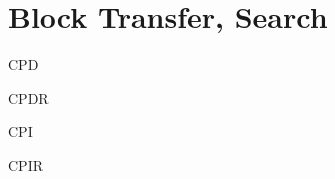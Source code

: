 \section{Block Transfer, Search}

\begin{minipage}{\textwidth}
	
\begin{instrtable}

    \begin{instruction}{CPD} 
        \Symbol{\SymCPD[0]}
            \FlagsCPD
        \SkipToSymbol
            \Symbol{\SymCPD[1]}
            \FromSymbolToOpCode
        \SkipToSymbol
            \Symbol{\SymCPD[2]}
    \end{instruction}

    \begin{instruction}{CPDR} 
        \Symbol{\SymCPDR[0]}
            \FlagsCPDR
        \SkipToSymbol
            \Symbol{\SymCPDR[1]}
            \FromSymbolToOpCode
            \Cycles{}{}
        \SkipToOpCode
            \OpCode{}{}{}
            \Hex{}{}
        \SkipToOpCode
            \OpCode{}{}{}
            \Hex{}{}
            \Cycles{}{}
    \end{instruction}

    \begin{instruction}{CPI} 
        \Symbol{\SymCPI[0]}
            \FlagsCPI
        \SkipToSymbol
            \Symbol{\SymCPI[1]}
            \FromSymbolToOpCode
        \SkipToSymbol
            \Symbol{\SymCPI[2]}
    \end{instruction}
	
    \begin{instruction}{CPIR} 
        \Symbol{\SymCPIR[0]}
            \FlagsCPIR
        \SkipToSymbol
            \Symbol{\SymCPIR[1]}
            \FromSymbolToOpCode
            \Cycles{}{}
        \SkipToOpCode
            \OpCode{}{}{}
            \Hex{}{}
        \SkipToOpCode
            \OpCode{}{}{}
            \Hex{}{}
            \Cycles{}{}
    \end{instruction}


\end{instrtable}
\end{minipage}

